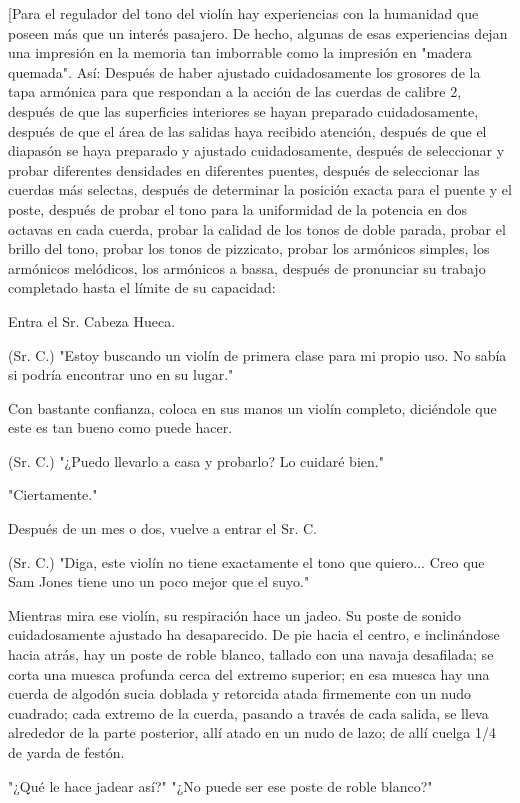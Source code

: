 \documentclass[12pt]{book}
\begin{document}
[Para el regulador del tono del violín hay experiencias con la humanidad que poseen más que un interés pasajero. De hecho, algunas de esas experiencias dejan una impresión en la memoria tan imborrable como la impresión en "madera quemada". Así: Después de haber ajustado cuidadosamente los grosores de la tapa armónica para que respondan a la acción de las cuerdas de calibre 2, después de que las superficies interiores se hayan preparado cuidadosamente, después de que el área de las salidas haya recibido atención, después de que el diapasón se haya preparado y ajustado cuidadosamente, después de seleccionar y probar diferentes densidades en diferentes puentes, después de seleccionar las cuerdas más selectas, después de determinar la posición exacta para el puente y el poste, después de probar el tono para la uniformidad de la potencia en dos octavas en cada cuerda, probar la calidad de los tonos de doble parada, probar el brillo del tono, probar los tonos de pizzicato, probar los armónicos simples, los armónicos melódicos, los armónicos a bassa, después de pronunciar su trabajo completado hasta el límite de su capacidad:

Entra el Sr. Cabeza Hueca.

(Sr. C.) "Estoy buscando un violín de primera clase para mi propio uso. No sabía si podría encontrar uno en su lugar."

Con bastante confianza, coloca en sus manos un violín completo, diciéndole que este es tan bueno como puede hacer.

(Sr. C.) "¿Puedo llevarlo a casa y probarlo? Lo cuidaré bien."

"Ciertamente."

Después de un mes o dos, vuelve a entrar el Sr. C.

(Sr. C.) "Diga, este violín no tiene exactamente el tono que quiero... Creo que Sam Jones tiene uno un poco mejor que el suyo."

Mientras mira ese violín, su respiración hace un jadeo. Su poste de sonido cuidadosamente ajustado ha desaparecido. De pie hacia el centro, e inclinándose hacia atrás, hay un poste de roble blanco, tallado con una navaja desafilada; se corta una muesca profunda cerca del extremo superior; en esa muesca hay una cuerda de algodón sucia doblada y retorcida atada firmemente con un nudo cuadrado; cada extremo de la cuerda, pasando a través de cada salida, se lleva alrededor de la parte posterior, allí atado en un nudo de lazo; de allí cuelga 1/4 de yarda de festón.

"¿Qué le hace jadear así?" "¿No puede ser ese poste de roble blanco?"
\end{document}

